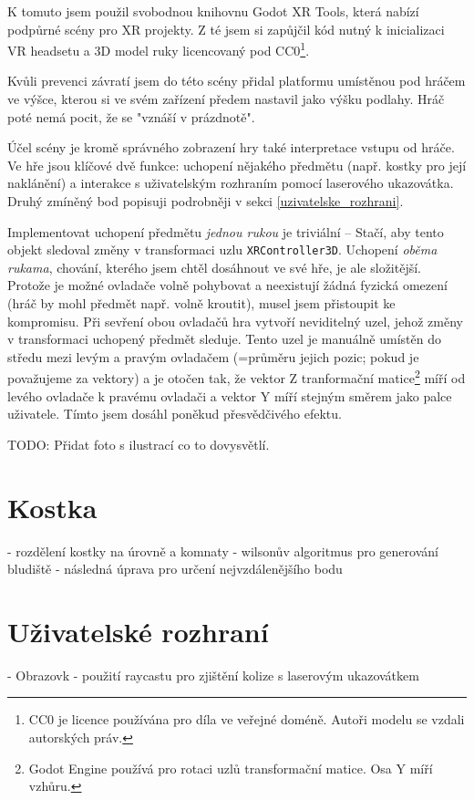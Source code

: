 K tomuto jsem použil svobodnou knihovnu Godot XR Tools, která nabízí podpůrné scény pro XR projekty. Z té jsem si zapůjčil kód nutný k inicializaci VR headsetu a 3D model ruky licencovaný pod CC0\footnote{CC0 je licence používána pro díla ve veřejné doméně. Autoři modelu se vzdali autorských práv.}.

Kvůli prevenci závratí jsem do této scény přidal platformu umístěnou pod hráčem ve výšce, kterou si ve svém zařízení předem nastavil jako výšku podlahy. Hráč poté nemá pocit, že se "vznáší v prázdnotě".

Účel scény je kromě správného zobrazení hry také interpretace vstupu od hráče. Ve hře jsou klíčové dvě funkce: uchopení nějakého předmětu (např. kostky pro její naklánění) a interakce s uživatelským rozhraním pomocí laserového ukazovátka. Druhý zmíněný bod popisuji podrobněji v sekci \ref{uzivatelske_rozhrani}.

Implementovat uchopení předmětu \textit{jednou rukou} je triviální -- Stačí, aby tento objekt sledoval změny v transformaci uzlu \texttt{XRController3D}. Uchopení \textit{oběma rukama}, chování, kterého jsem chtěl dosáhnout ve své hře, je ale složitější. Protože je možné ovladače volně pohybovat a neexistují žádná fyzická omezení (hráč by mohl předmět např. volně kroutit), musel jsem přistoupit ke kompromisu. Při sevření obou ovladačů hra vytvoří neviditelný uzel, jehož změny v transformaci uchopený předmět sleduje. Tento uzel je manuálně umístěn do středu mezi levým a pravým ovladačem (=průměru jejich pozic; pokud je považujeme za vektory) a je otočen tak, že vektor Z tranformační matice\footnote{Godot Engine používá pro rotaci uzlů transformační matice. Osa Y míří vzhůru.} míří od levého ovladače k pravému ovladači a vektor Y míří stejným směrem jako palce uživatele. Tímto jsem dosáhl poněkud přesvědčivého efektu.

TODO: Přidat foto s ilustrací co to dovysvětlí.

\section{Kostka}

- rozdělení kostky na úrovně a komnaty
- wilsonův algoritmus pro generování bludiště
- následná úprava pro určení nejvzdálenějšího bodu

\label{uzivatelske_rozhrani}
\section{Uživatelské rozhraní}

- Obrazovk
- použití raycastu pro zjištění kolize s laserovým ukazovátkem